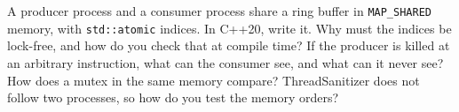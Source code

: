 \begin{question}\label{iq:iv3:operating-systems-concurrency-and-networks:40}
A producer process and a consumer process share a ring buffer in \texttt{MAP\_SHARED} memory, with \texttt{std::atomic} indices. In C++20, write it. Why must the indices be lock-free, and how do you check that at compile time? If the producer is killed at an arbitrary instruction, what can the consumer see, and what can it never see? How does a mutex in the same memory compare? ThreadSanitizer does not follow two processes, so how do you test the memory orders?
\end{question}
